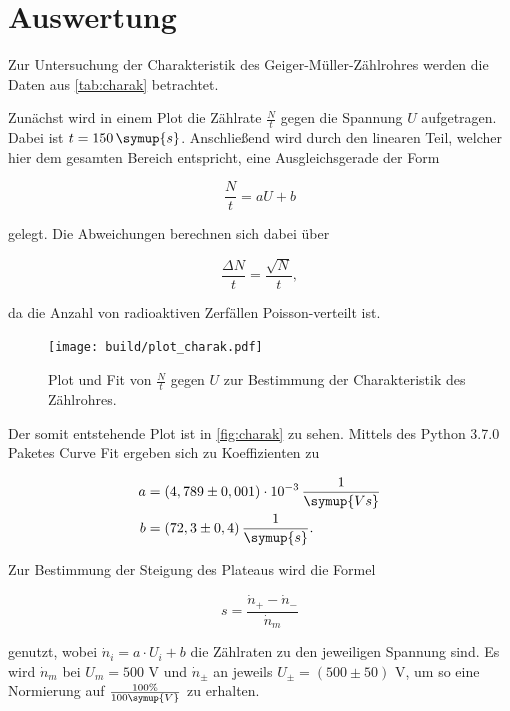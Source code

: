 \section{Auswertung}
\label{sec:Auswertung}

Zur Untersuchung der Charakteristik des Geiger-Müller-Zählrohres werden die Daten aus \autoref{tab:charak} betrachtet.



Zunächst wird in einem Plot die Zählrate $\frac{N}{t}$ gegen die Spannung $U$ aufgetragen. Dabei ist $t = 150 \, \symup{s}$.
Anschließend wird durch den linearen Teil, welcher hier dem gesamten Bereich entspricht, eine Ausgleichsgerade der Form

\begin{equation}
    \frac{N}{t} = a U + b
\end{equation}

gelegt. Die Abweichungen berechnen sich dabei über

\begin{equation}
    \frac{\Delta N}{t} = \frac{\sqrt{N}}{t},
\end{equation}

da die Anzahl von radioaktiven Zerfällen Poisson-verteilt ist.

\begin{figure}
  \centering
  \texttt{[image: build/plot\_charak.pdf]}
  \caption{Plot und Fit von $\frac{N}{t}$ gegen $U$ zur Bestimmung der Charakteristik des Zählrohres.}
  \label{fig:charak}
\end{figure}

Der somit entstehende Plot ist in \autoref{fig:charak} zu sehen.
Mittels des Python 3.7.0 Paketes Curve Fit ergeben sich zu Koeffizienten zu

\begin{align*}
    a &= (4,789 \pm 0,001) \cdot 10^{-3} \, \frac{1}{\symup{Vs}}\\
    b &= (72,3 \pm 0,4) \, \frac{1}{\symup{s}}.
\end{align*}

Zur Bestimmung der Steigung des Plateaus wird die Formel

\begin{equation}
    s = \frac{\dot{n}_+ - \dot{n}_-}{\dot{n}_m}
\end{equation}

genutzt, wobei $\dot{n}_i = a \cdot U_i + b$ die Zählraten zu den jeweiligen Spannung sind.
Es wird $\dot{n}_m$ bei $U_m = 500$ V und $\dot{n}_\pm$ an jeweils $U_\pm = (500 \pm 50)$ V, um so eine Normierung auf $\frac{100 \%}{100\symup{V}}$ zu erhalten.

